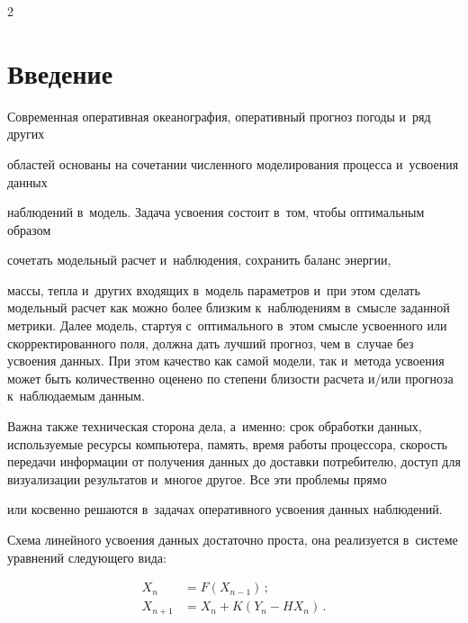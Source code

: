 \begin{multicols}{2}



\label{st\stat}





\section{Введение}



Современная оперативная океанография, оперативный прогноз погоды и~ряд других

областей основаны на сочетании численного моделирования процесса и~усвоения данных

наблюдений в~модель. Задача усвоения состоит в~том, чтобы оптимальным образом

сочетать модельный расчет и~наблюдения, сохранить баланс энергии,

массы, тепла и~других входящих в~модель параметров и~при этом сделать модельный расчет как можно более близким к~наблюдениям в~смысле заданной метрики. Далее модель, стартуя с~оптимального в~этом смысле усвоенного или скорректированного поля, должна дать лучший прогноз, чем в~случае без усвоения данных. При этом качество как самой модели, так и~метода усвоения может быть количественно оценено по степени близости расчета и/или прогноза к~наблюдаемым данным.

Важна также техническая сторона дела, а~именно: срок обработки данных, используемые ресурсы компьютера, память, время работы процессора, скорость передачи информации от получения данных до доставки потребителю, доступ для визуализации результатов и~многое другое. Все эти проблемы прямо

или косвенно решаются в~задачах оперативного усвоения данных наблюдений.



Схема линейного усвоения данных достаточно проста, она реализуется в~системе уравнений следующего вида:

\begin{equation}

\left.

\begin{array}{rl}

X_n&=F\left(X_{n-1}\right)\,;\\[6pt]

X_{n+1}&=X_n+K\left(Y_n-HX_n\right)\,.

\end{array}


\end{equation}
\end{multicols}
